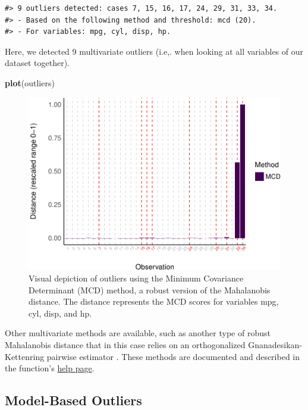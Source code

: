 \documentclass[sn-basic, lineno,pdflatex]{sn-jnl}
\newenvironment{Shaded}{\begin{snugshade}}{\end{snugshade}}
\newcommand{\FunctionTok}[1]{\textcolor[rgb]{0.13,0.29,0.53}{\textbf{#1}}}
\newcommand{\NormalTok}[1]{#1}
\begin{document}
\begin{verbatim}
#> 9 outliers detected: cases 7, 15, 16, 17, 24, 29, 31, 33, 34.
#> - Based on the following method and threshold: mcd (20).
#> - For variables: mpg, cyl, disp, hp.
\end{verbatim}

Here, we detected 9 multivariate outliers (i.e,. when looking at all
variables of our dataset together).

\begin{Shaded}
\begin{Highlighting}[]
\FunctionTok{plot}\NormalTok{(outliers)}
\end{Highlighting}
\end{Shaded}

\begin{figure}
\includegraphics[width=1\linewidth]{paper_files/figure-latex/multivariate_implicit-1} \caption{Visual depiction of outliers using the Minimum Covariance Determinant (MCD) method, a robust version of the Mahalanobis distance. The distance represents the MCD scores for variables mpg, cyl, disp, and hp.}\label{fig:multivariate_implicit}
\end{figure}

Other multivariate methods are available, such as another type of robust
Mahalanobis distance that in this case relies on an orthogonalized
Gnanadesikan-Kettenring pairwise estimator
\citep{gnanadesikan1972robust}. These methods are documented and
described in the function's
\href{https://easystats.github.io/performance/reference/check_outliers.html}{help
page}.

\hypertarget{model-based-outliers}{%
\subsection{Model-Based Outliers}\label{model-based-outliers}}
\end{document}
